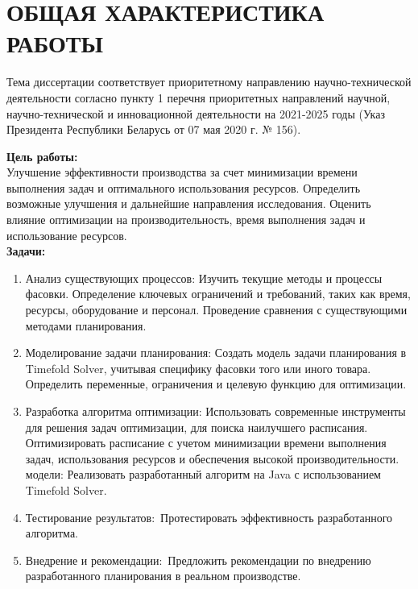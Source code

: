 \chapter*{ОБЩАЯ ХАРАКТЕРИСТИКА РАБОТЫ}
\label{ch:target}

Тема диссертации соответствует приоритетному направлению научно-технической деятельности согласно пункту 1 перечня приоритетных направлений научной, научно-технической и инновационной деятельности на 2021-2025 годы (Указ Президента Республики Беларусь от 07 мая 2020 г. № 156).

\vspace{3mm}
\aim
\vspace{3mm}

\noindent \textbf{Цель работы:} \\
\indent Улучшение эффективности производства за счет минимизации времени выполнения задач и оптимального использования ресурсов. Определить возможные улучшения и дальнейшие направления исследования. Оценить влияние оптимизации на производительность, время выполнения задач и использование ресурсов.  \\

\noindent \textbf{Задачи:}
\begin{enumerate}
    \item Анализ существующих процессов:
Изучить текущие методы и процессы фасовки.
Определение ключевых ограничений и требований, таких как время, ресурсы, оборудование и персонал. Проведение сравнения с существующими методами планирования.
    \item  Моделирование задачи планирования:
Создать модель задачи планирования в Timefold Solver, учитывая специфику фасовки того или иного товара. Определить переменные, ограничения и целевую функцию для оптимизации.
    \item Разработка алгоритма оптимизации:
Использовать современные инструменты для решения задач оптимизации, для поиска наилучшего расписания.
Оптимизировать расписание с учетом минимизации времени выполнения задач, использования ресурсов и обеспечения высокой производительности.
     модели:
Реализовать разработанный алгоритм на Java с использованием Timefold Solver.
    \item Тестирование результатов:\
Протестировать эффективность разработанного алгоритма.
\item Внедрение и рекомендации:\
Предложить рекомендации по внедрению разработанного планирования в реальном производстве.
\end{enumerate}

